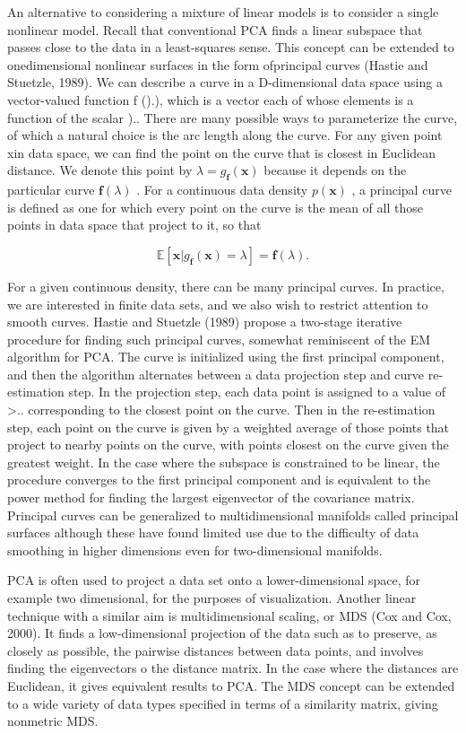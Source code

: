 \documentclass[
  10
]{article}
\begin{document}
An alternative to considering a mixture of linear models is to consider
a single nonlinear model. Recall that conventional PCA finds a linear
subspace that passes close to the data in a least-squares sense. This
concept can be extended to onedimensional nonlinear surfaces in the form
ofprincipal curves (Hastie and Stuetzle, 1989). We can describe a curve
in a D-dimensional data space using a vector-valued function f ().),
which is a vector each of whose elements is a function of the scalar )..
There are many possible ways to parameterize the curve, of which a
natural choice is the arc length along the curve. For any given point
xin data space, we can find the point on the curve that is closest in
Euclidean distance. We denote this point by
\(\lambda = g _ { \mathbf { f } } ( \mathbf { x } )\) because it depends
on the particular curve \(\mathbf f ( \lambda )\) . For a continuous
data density \(p ( \mathbf { x } )\) , a principal curve is defined as
one for which every point on the curve is the mean of all those points
in data space that project to it, so that

\[
\mathbb {E} \left[ \mathbf {x} | g _ {\mathbf {f}} (\mathbf {x}) = \lambda \right] = \mathbf {f} (\lambda).\tag{12.92}
\]

For a given continuous density, there can be many principal curves. In
practice, we are interested in finite data sets, and we also wish to
restrict attention to smooth curves. Hastie and Stuetzle (1989) propose
a two-stage iterative procedure for finding such principal curves,
somewhat reminiscent of the EM algorithm for PCA. The curve is
initialized using the first principal component, and then the algorithm
alternates between a data projection step and curve re-estimation step.
In the projection step, each data point is assigned to a value of
\textgreater.. corresponding to the closest point on the curve. Then in
the re-estimation step, each point on the curve is given by a weighted
average of those points that project to nearby points on the curve, with
points closest on the curve given the greatest weight. In the case where
the subspace is constrained to be linear, the procedure converges to the
first principal component and is equivalent to the power method for
finding the largest eigenvector of the covariance matrix. Principal
curves can be generalized to multidimensional manifolds called principal
surfaces although these have found limited use due to the difficulty of
data smoothing in higher dimensions even for two-dimensional manifolds.

PCA is often used to project a data set onto a lower-dimensional space,
for example two dimensional, for the purposes of visualization. Another
linear technique with a similar aim is multidimensional scaling, or MDS
(Cox and Cox, 2000). It finds a low-dimensional projection of the data
such as to preserve, as closely as possible, the pairwise distances
between data points, and involves finding the eigenvectors o the
distance matrix. In the case where the distances are Euclidean, it gives
equivalent results to PCA. The MDS concept can be extended to a wide
variety of data types specified in terms of a similarity matrix, giving
nonmetric MDS.
\end{document}
